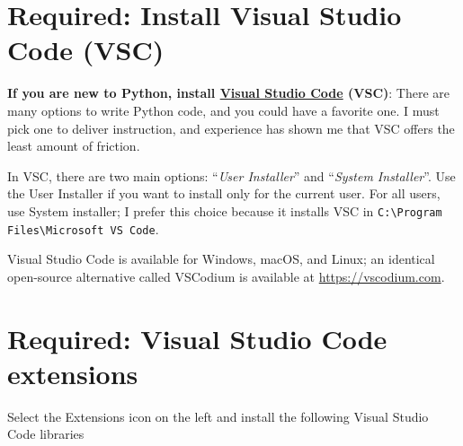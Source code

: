\section{Required: Install Visual Studio Code (VSC)}\label{sec:vsc}

\textbf{If you are new to Python, install \href{https://code.visualstudio.com}{Visual Studio Code} (VSC)}: There are many options to write Python code, and you could have a favorite one. I must pick one to deliver instruction, and experience has shown me that VSC offers the least amount of friction.

\vs

In VSC, there are two main options: ``\textit{User Installer}'' and ``\textit{System Installer}''. Use the User Installer if you want to install only for the current user. For all users, use System installer; I prefer this choice because it installs VSC in \texttt{C:\textbackslash Program Files\textbackslash Microsoft VS Code}.

\vs

Visual Studio Code is available for Windows, macOS, and Linux; an identical open-source alternative called VSCodium is available at \url{https://vscodium.com}.

\section{Required: Visual Studio Code extensions}\label{sec:extensions}

Select the Extensions icon on the left and install the following Visual Studio Code libraries

